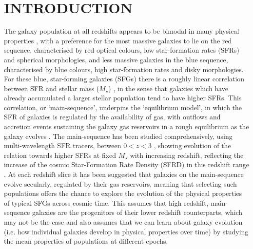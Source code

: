 \documentclass[fleqn,usenatbib]{mnras}
\begin{document}
\section{INTRODUCTION}

The galaxy population at all redshifts appears to be bimodal in many physical properties \citep[e.g. as described in][]{Dekel2006}, with a preference for the most massive galaxies to lie on the red sequence, characterised by red optical colours, low star-formation rates (SFRs) and spherical morphologies, and less massive galaxies in the blue sequence, characterised by blue colours, high star-formation rates and disky morphologies. 
For these blue, star-forming galaxies (SFGs) there is a roughly linear correlation between SFR and stellar mass ($M_{\star}$) \citep[e.g.][]{Daddi2007,Noeske2007,Elbaz2007}, in the sense that galaxies which have already accumulated a larger stellar population tend to have higher SFRs.
This correlation, or `main-sequence', underpins the `equilibrium model', in which the SFR of galaxies is regulated by the availability of gas, with outflows and accretion events sustaining the galaxy gas reservoirs in a rough equilibrium as the galaxy evolves \citep[e.g.][]{Dave2012,Lilly2013,Saintonge2013}.
The main-sequence has been studied comprehensively, using multi-wavelength SFR tracers, between $0 < z < 3$ \citep[e.g.][]{Rodighiero2011,Karim2011,Whitaker2012,Behroozi2013b,Whitaker2014,Rodighiero2014,Speagle2014,Pannella2014,Sobral2014,Sparre2015,Lee2015,Schreiber2015,Renzini2015,Nelson2016}, showing evolution of the relation towards higher SFRs at fixed $M_{\star}$ with increasing redshift, reflecting the increase of the cosmic Star-Formation Rate Density (SFRD) in this redshift range \citep[e.g.][]{Madau_2014,Khostovan2015}.
At each redshift slice it has been suggested that galaxies on the main-sequence evolve secularly, regulated by their gas reservoirs, meaning that selecting such populations offers the chance to explore the evolution of the physical properties of typical SFGs across cosmic time.
This assumes that high redshift, main-sequence galaxies are the progenitors of their lower redshift counterparts, which may not be the case \citep[e.g.][]{Gladders2013,Kelson2014,Abramson2016b} and also assumes that we can learn about galaxy evolution (i.e. how individual galaxies develop in physical properties over time) by studying the mean properties of populations at different epochs. 
\end{document}
